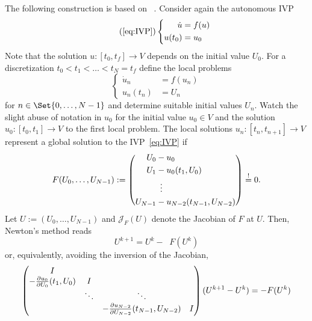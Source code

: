 The following construction is based on \citeauthor{Gander2007}~\cite{Gander2007}.
Consider again the autonomous \ac{IVP}
\begin{equation}
  \tag{\ref*{eq:IVP}}
  \left\{
  \begin{aligned}
    \dot u &= f(u) \\
    u(t_0) &= u_0
  \end{aligned}
  \right.
\end{equation}
Note that the solution $u : [t_0,t_f] \to V $ depends on the initial value $U_0$.
For a discretization $t_0 < t_1 < \ldots < t_N = t_f$
define the local problems
\begin{equation}
  \left\{
  \begin{aligned}
    \dot u_n &= f(u_n) \\
    u_n(t_n) &= U_n
  \end{aligned}
  \right.
\end{equation}
for $n \in \Set{0,\ldots,N-1}$
and determine suitable initial values $U_n$.
Watch the slight abuse of notation in $u_0$
for the initial value $u_0 \in V$
and the solution $u_0 : [t_0,t_1] \to V$ to the first local problem.
The local solutions $u_n : [t_n,t_{n+1}] \to V$ represent a global solution to the \ac{IVP}~\eqref{eq:IVP} if
\begin{equation}
  F(U_0, \ldots, U_{N-1}) :=
  \left(
  \begin{aligned}
    U_0 &- u_0 \\
    U_1 &- u_0(t_1, U_0) \\
    &\vdotswithin{-} \\
    U_{N-1} &- u_{N-2}(t_{N-1}, U_{N-2})
  \end{aligned}
  \right)
  \overset{!}{=} 0.
\end{equation}
Let $U := (U_0, \ldots, U_{N-1})$ and $\mathcal J_F(U)$ denote the Jacobian of $F$ at $U$.
Then, Newton's method reads
\begin{equation}
  U^{k+1} = U^k - \mathop{\mathcal J_F(U^k)^{-1}} F(U^k)
\end{equation}
or, equivalently, avoiding the inversion of the Jacobian,
\begin{equation}
  \begin{pmatrix}
    I \\
    -\pdiff{U_0}{u_0}(t_1, U_0) & I \\
    & \ddots & \ddots \\
    && -\pdiff{U_{N-2}}{u_{N-2}}(t_{N-1}, U_{N-2}) & I
  \end{pmatrix}
  (U^{k+1} - U^k) = -F(U^k)
\end{equation}
